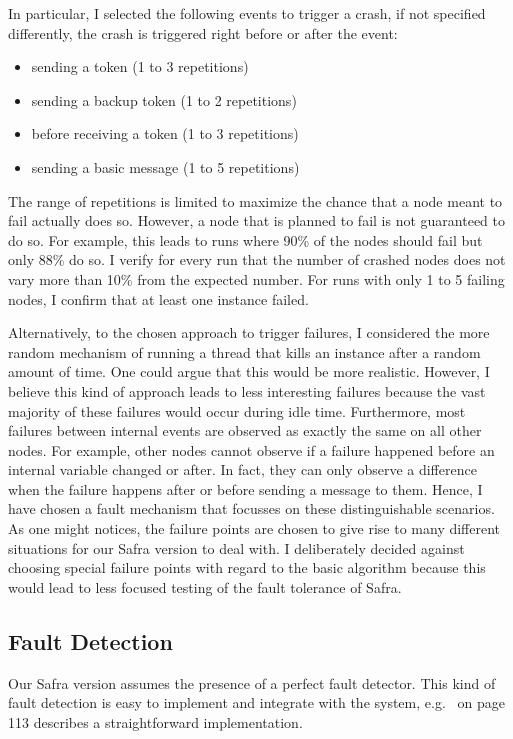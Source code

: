 In particular, I selected the following events to trigger a crash, if not specified differently, the crash is triggered right before or after the event:
\begin{itemize}
    \item sending a token (1 to 3 repetitions)
    \item sending a backup token (1 to 2 repetitions)
    \item before receiving a token (1 to 3 repetitions)
    \item sending a basic message (1 to 5 repetitions)
\end{itemize}
The range of repetitions is limited to maximize the chance that a node meant to fail actually does so.
However, a node that is planned to fail is not guaranteed to do so.
For example, this leads to runs where 90\% of the nodes should fail but only 88\% do so.
I verify for every run that the number of crashed nodes does not vary more than 10\% from the expected number. For runs with only 1 to 5 failing nodes, I confirm that at least one instance failed.

Alternatively, to the chosen approach to trigger failures, I considered the more random mechanism of running a thread that kills an instance after a random amount of time.
One could argue that this would be more realistic.
However, I believe this kind of approach leads to less interesting failures because the vast majority of these failures would occur during idle time.
Furthermore, most failures between internal events are observed as exactly the same on all other nodes.
For example, other nodes cannot observe if a failure happened before an internal variable changed or after.
In fact, they can only observe a difference when the failure happens after or before sending a message to them.
Hence, I have chosen a fault mechanism that focusses on these distinguishable scenarios.
As one might notices, the failure points are chosen to give rise to many different situations for our Safra version to deal with.
I deliberately decided against choosing special failure points with regard to the basic algorithm because this would lead to less focused testing of the fault tolerance of Safra.

\subsection{Fault Detection}
Our Safra version assumes the presence of a perfect fault detector.
This kind of fault detection is easy to implement and integrate with the system, e.g.~\cite{fokkink:2018} on page 113 describes a straightforward implementation.

